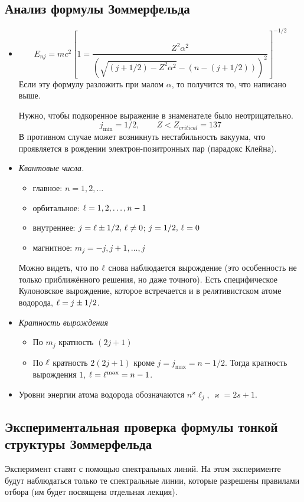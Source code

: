 \subsection{Анализ формулы Зоммерфельда}
\begin{itemize}
  \item $$
    E_{nj} = mc^2 \left[
        1 = \dfrac{Z^2 \alpha^2}{(\sqrt{(j+1/2) - Z^2 \alpha^2} - (n - (j + 1/2)))^2}
    \right]^{-1/2}
  $$
  Если эту формулу разложить при малом $\alpha$, то получится то, что написано выше.
  
  Нужно, чтобы подкоренное выражение в знаменателе было неотрицательно.
  $$
    j_{\min} = 1/2, \qquad Z < Z_{critical} = 137
  $$
  В противном случае может возникнуть нестабильность вакуума, что проявляется в рождении электрон-позитронных пар (парадокс Клейна).
  \item \emph{Квантовые числа.}
  \begin{itemize}
    \item главное: $n = 1, 2, \ldots$
    \item орбитальное: $\ell = 1, 2, \ldots, n-1$
    \item внутреннее: $j = \ell \pm 1/2, \, \ell \ne 0$; $j = 1/2, \, \ell = 0$
    \item магнитное: $m_j = -j, j+1, \ldots, j$
  \end{itemize}
  Можно видеть, что по $\ell$ снова наблюдается вырождение (это особенность не только приближённого решения, но даже точного). Есть специфическое Кулоновское вырождение, которое встречается и в релятивистском атоме водорода, $\ell = j \pm 1/2$. 
    \item \emph{Кратность вырождения}
    \begin{itemize}
      \item По $m_j$ кратность $(2j+1)$
      \item По $\ell$ кратность $2(2j+1)$ кроме $j=j_{\max} = n - 1/2$. Тогда кратность вырождения $1$, $\ell = \ell^{\max} = n-1$.
    \end{itemize}
    \item Уровни энергии атома водорода обозначаются $n^{\varkappa} \ell_j$, $\varkappa = 2s + 1$.
\end{itemize}
\subsection{Экспериментальная проверка формулы тонкой структуры Зоммерфельда}
Эксперимент ставят с помощью спектральных линий. На этом эксперименте будут наблюдаться только те спектральные линии, которые разрешены правилами отбора (им будет посвящена отдельная лекция).

